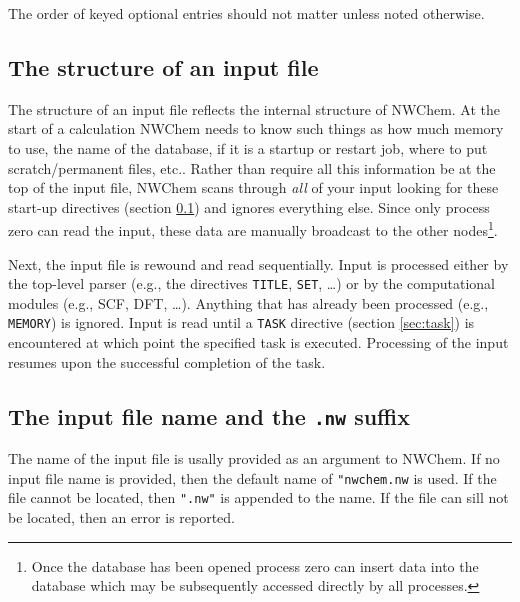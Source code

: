 The order of keyed optional entries should not matter unless noted
otherwise.

\subsection{The structure of an input file}
\label{sec:inputstructure}

The structure of an input file reflects the internal structure of
NWChem.  At the start of a calculation NWChem needs to know such
things as how much memory to use, the name of the database, if it is a
startup or restart job, where to put scratch/permanent files, etc..
Rather than require all this information be at the top of the input
file, NWChem scans through {\em all} of your input looking for these
start-up directives (section \ref{sec:inputstructure}) and ignores everything else.
Since only process zero can read the input, these data are manually
broadcast to the other nodes\footnote{Once the database has been opened
process zero can insert data into the database which may be
subsequently accessed directly by all processes.}.

Next, the input file is rewound and read sequentially.  Input is
processed either by the top-level parser (e.g., the directives
\verb+TITLE+, \verb+SET+, \ldots) or by the computational modules
(e.g., SCF, DFT, \ldots).  Anything that has already been processed
(e.g., \verb+MEMORY+) is ignored.  Input is read until a \verb+TASK+
directive (section \ref{sec:task}) is encountered at which point the specified
task is executed.  Processing of the input resumes upon the successful
completion of the task.

\subsection{The input file name and the {\tt .nw} suffix}
\label{sec:inputfilename}

The name of the input file is usally provided as an argument to
NWChem.  If no input file name is provided, then the default name of
\verb+"nwchem.nw+ is used.  If the file cannot be located, then
\verb+".nw"+ is appended to the name.  If the file can sill not be
located, then an error is reported.
